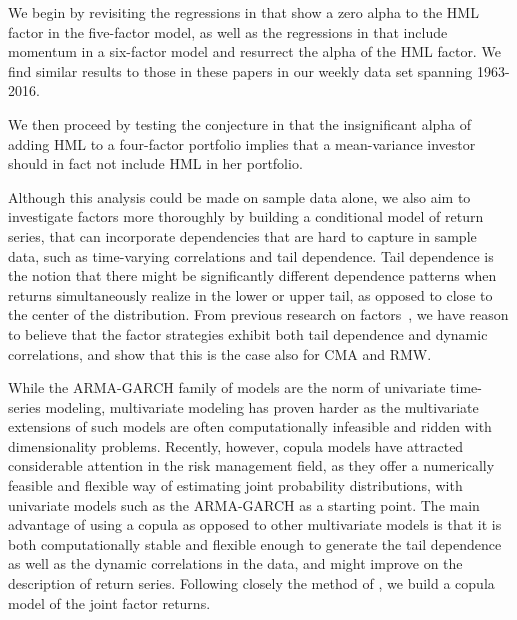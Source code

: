 We begin by revisiting the regressions in \textcite{FF2015} that show a zero alpha to the HML factor in the five-factor model, as well as the regressions in \textcite{Asness2015} that include momentum in a six-factor model and resurrect the alpha of the HML factor. We find similar results to those in these papers in our weekly data set spanning 1963-2016. 

We then proceed by testing the conjecture in \textcite{FF2015} that the insignificant alpha of adding HML to a four-factor portfolio implies that a mean-variance investor should in fact not include HML in her portfolio. 

Although this analysis could be made on sample data alone, we also aim to investigate factors more thoroughly by building a conditional model of return series, that can incorporate dependencies that are hard to capture in sample data, such as time-varying correlations and tail dependence. Tail dependence is the notion that there might be significantly different dependence patterns when returns simultaneously realize in the lower or upper tail, as opposed to close to the center of the distribution. From previous research on factors~\autocite{ChristoffersenLanglois2013}, we have reason to believe that the factor strategies exhibit both tail dependence and dynamic correlations, and show that this is the case also for CMA and RMW.

While the ARMA-GARCH family of models are the norm of univariate time-series modeling, multivariate modeling has proven harder as the multivariate extensions of such models are often computationally infeasible and ridden with dimensionality problems. Recently, however, copula models have attracted considerable attention in the risk management field, as they offer a numerically feasible and flexible way of estimating joint probability distributions, with univariate models such as the ARMA-GARCH as a starting point. The main advantage of using a copula as opposed to other multivariate models is that it is both computationally stable and flexible enough to generate the tail dependence as well as the dynamic correlations in the data, and might improve on the description of return series. Following closely the method of \textcite{ChristoffersenLanglois2013}, we build a copula model of the joint factor returns.


